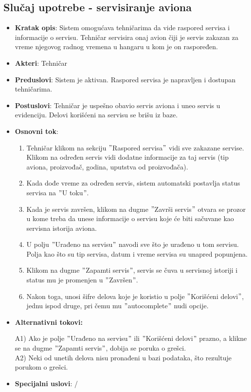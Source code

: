 \documentclass[a4paper]{article}
\begin{document}
\subsection{Slučaj upotrebe - servisiranje aviona}
\label{subsec:servisiranje_aviona}
\begin{itemize}
    \item \textbf{Kratak opis}: Sistem omogućava tehničarima da vide raspored servisa i informacije o servisu. Tehničar servisira onaj avion čiji je servis zakazan za vreme njegovog radnog vremena u hangaru u kom je on raspoređen.
    \item \textbf{Akteri}: Tehničar
    \item \textbf{Preduslovi}: Sistem je aktivan. Raspored servisa je napravljen i dostupan tehničarima.
    \item \textbf{Postuslovi}: Tehničar je uspešno obavio servis aviona i uneo servis u evidenciju. Delovi korišćeni na servisu se brišu iz baze.
    \item \textbf{Osnovni tok}:
        \begin{enumerate}
            \item Tehničar klikom na sekciju $"$Raspored servisa$"$ vidi sve zakazane servise. Klikom na određen servis vidi dodatne informacije za taj servis (tip aviona, proizvođač, godina, uputstva od proizvođača).
            \item Kada dođe vreme za određen servis, sistem automatski postavlja status servisa na $"$U toku$"$.
            \item Kada je servis završen, klikom na dugme $"$Završi servis$"$ otvara se prozor u kome treba da unese informacije o servisu koje će biti sačuvane kao servisna istorija aviona.
            \item U polju $"$Urađeno na servisu$"$ navodi sve što je urađeno u tom servisu. Polja kao što su tip servisa, datum i vreme servisa su unapred popunjena.
            \item Klikom na dugme $"$Zapamti servis$"$, servis se čuva u servisnoj istoriji i status mu je promenjen u $"$Završen$"$.
            \item Nakon toga, unosi šifre delova koje je koristio u polje $"$Korišćeni delovi$"$, jednu ispod druge, pri čemu mu $"$autocomplete$"$ nudi opcije.
        \end{enumerate}
    \item \textbf{Alternativni tokovi:}
        \begin{enumerate}
            A1) Ako je polje $"$Urađeno na servisu$"$ ili $"$Korišćeni delovi$"$ prazno, a klikne se na dugme $"$Zapamti servis$"$, dobija se poruka o grešci.\\
            A2) Neki od unetih delova nisu pronađeni u bazi podataka, što rezultuje porukom o grešci.
        \end{enumerate}
    \item \textbf{Specijalni uslovi}: /
\end{itemize}
\end{document}
